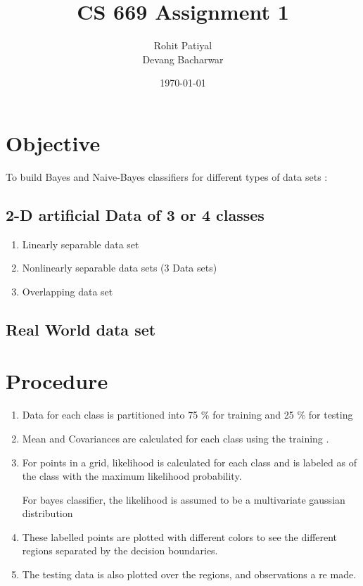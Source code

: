 \documentclass[a4paper]{article}
\title{CS 669 Assignment 1}
\author{Rohit Patiyal \\ Devang Bacharwar}
\date{\today}
\begin{document}
\maketitle

\vspace{2.0cm}

\section {Objective}
	To build Bayes and Naive-Bayes classifiers for different types of data sets :
	\subsection{2-D artificial Data of 3 or 4 classes}
		\begin{enumerate}
		  \item {Linearly separable data set}
		  \item {Nonlinearly separable data sets (3 Data sets)}
		  \item {Overlapping data set}
		\end{enumerate}
	\subsection{Real World data set}

\vspace{2.0cm}

\section{Procedure}
	\begin{enumerate}
	  \item {Data for each class is partitioned into 75 \% for training and 25
	  \% for testing }
	  \item {Mean and Covariances are calculated for each class using the
	  training .}
	  \item {For points in a grid, likelihood is calculated for each class and is
	  labeled as of the class with the maximum likelihood probability.}
	  \par{For bayes classifier, the likelihood is assumed to be a multivariate
	  gaussian distribution }
	  \item {These labelled points are plotted with different colors to see the
	  different regions separated by the decision boundaries.}
	  \item {The testing data is also plotted over the regions, and observations a
	  re made.}
	\end{enumerate}
\vspace{2.0cm}
\end{document}
